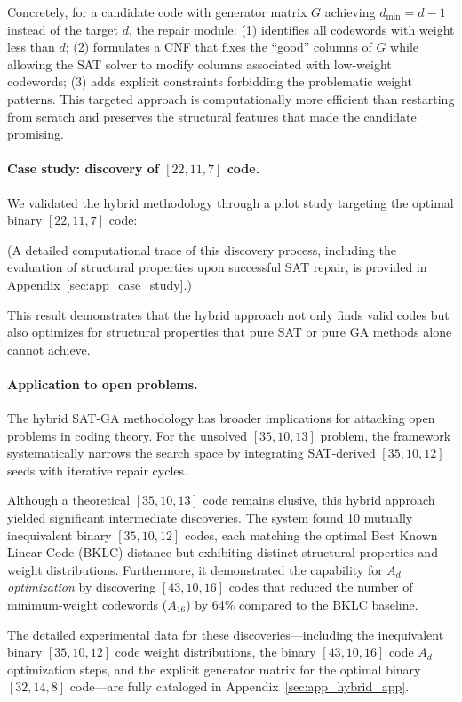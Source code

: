 Concretely, for a candidate code with generator matrix $G$ achieving $d_{\min} = d-1$ instead of the target $d$, the repair module: (1) identifies all codewords with weight less than $d$; (2) formulates a CNF that fixes the ``good'' columns of $G$ while allowing the SAT solver to modify columns associated with low-weight codewords; (3) adds explicit constraints forbidding the problematic weight patterns. This targeted approach is computationally more efficient than restarting from scratch and preserves the structural features that made the candidate promising.

\paragraph{Case study: discovery of $[22,11,7]$ code.} We validated the hybrid methodology through a pilot study targeting the optimal binary $[22,11,7]$ code:

(A detailed computational trace of this discovery process, including the evaluation of structural properties upon successful SAT repair, is provided in Appendix~\ref{sec:app_case_study}.)

This result demonstrates that the hybrid approach not only finds valid codes but also optimizes for structural properties that pure SAT or pure GA methods alone cannot achieve.

\paragraph{Application to open problems.} The hybrid SAT-GA methodology has broader implications for attacking open problems in coding theory. For the unsolved $[35,10,13]$ problem, the framework systematically narrows the search space by integrating SAT-derived $[35,10,12]$ seeds with iterative repair cycles. 

Although a theoretical $[35,10,13]$ code remains elusive, this hybrid approach yielded significant intermediate discoveries. The system found 10 mutually inequivalent binary $[35,10,12]$ codes, each matching the optimal Best Known Linear Code (BKLC) distance but exhibiting distinct structural properties and weight distributions. Furthermore, it demonstrated the capability for \textit{$A_d$ optimization} by discovering $[43,10,16]$ codes that reduced the number of minimum-weight codewords ($A_{16}$) by 64\% compared to the BKLC baseline. 

The detailed experimental data for these discoveries---including the inequivalent binary $[35,10,12]$ code weight distributions, the binary $[43,10,16]$ code $A_d$ optimization steps, and the explicit generator matrix for the optimal binary $[32,14,8]$ code---are fully cataloged in Appendix~\ref{sec:app_hybrid_app}.

